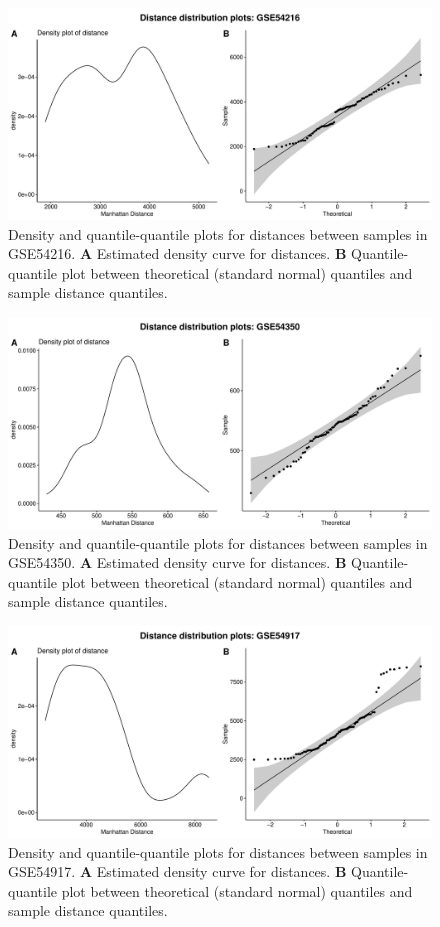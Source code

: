 \documentclass[10pt,letterpaper]{article}\usepackage[]{graphicx}\usepackage[]{color}
\begin{document}
\begin{figure}[H]
	\includegraphics[width=\textwidth]{manhattan-distance_hist_GSE54216.pdf}
	\caption{Density and quantile-quantile plots for distances between samples in GSE54216. \textbf{A} Estimated density curve for distances. \textbf{B} Quantile-quantile plot between theoretical (standard normal) quantiles and sample distance quantiles.}
\end{figure}

\begin{figure}[H]
	\includegraphics[width=\textwidth]{manhattan-distance_hist_GSE54350.pdf}
	\caption{Density and quantile-quantile plots for distances between samples in GSE54350. \textbf{A} Estimated density curve for distances. \textbf{B} Quantile-quantile plot between theoretical (standard normal) quantiles and sample distance quantiles.}
\end{figure}

\begin{figure}[H]
	\includegraphics[width=\textwidth]{manhattan-distance_hist_GSE54917.pdf}
	\caption{Density and quantile-quantile plots for distances between samples in GSE54917. \textbf{A} Estimated density curve for distances. \textbf{B} Quantile-quantile plot between theoretical (standard normal) quantiles and sample distance quantiles.}
\end{figure}
\end{document}

